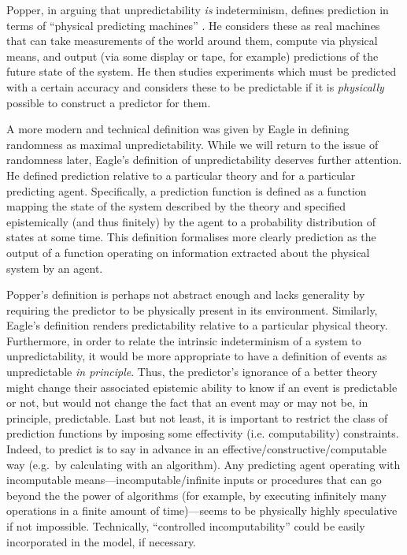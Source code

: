 \documentclass[%
 superscriptaddress,
 preprint,
 showpacs,
 showkeys,
 preprintnumbers,
  amsmath,amssymb,
  aps,
 pra,
  longbibliography,
  floatfix,
 ]{revtex4-1}
\theoremstyle{definition}
\begin{document}
Popper, in arguing that unpredictability \emph{is} indeterminism, defines prediction in terms of ``physical predicting machines'' \cite{popper-50i}.
He considers these as real machines that can take measurements of the world around them, compute via physical means, and output (via some display or tape, for example) predictions of the future state of the system.
He then studies experiments which must be predicted with a certain accuracy and considers these to be predictable if it is \emph{physically} possible to construct a predictor for them.

A more modern and technical definition was given by Eagle \cite{Eagle:2005ys} in defining randomness as maximal unpredictability.
While we will return to the issue of randomness later, Eagle's definition of unpredictability deserves further attention.
He defined prediction relative to a particular theory and for a particular predicting agent.
Specifically, a prediction function is defined as a function mapping the state of the system described by the theory and specified epistemically (and thus finitely) by the agent to a probability distribution of states at some time.
This definition formalises more clearly prediction as the output of a function operating on information extracted about the physical system by an agent.

Popper's definition is perhaps not abstract enough and lacks generality by requiring the predictor to be physically present in its environment.
Similarly, Eagle's definition renders predictability relative to a particular physical theory.
Furthermore, in order to relate the intrinsic indeterminism of a system to unpredictability, it would be more appropriate to have a definition of events as unpredictable \emph{in principle}.
Thus, the predictor's ignorance of a better theory might change their associated epistemic ability to know if an event is predictable or not, but would not change the fact that an event may or may not be, in principle, predictable.
Last but not least,  it is important to restrict the class of prediction functions by imposing some effectivity (i.e. computability) constraints.
Indeed, to predict is to say in advance in an effective/constructive/computable way (e.g.\ by calculating with an algorithm).
Any predicting agent operating with incomputable means---incomputable/infinite inputs or procedures that can go beyond the
the power of algorithms (for example, by executing infinitely many operations in a finite amount of time)---seems to be physically highly speculative if not impossible.
Technically, ``controlled incomputability'' could be easily incorporated in the model, if necessary.
\end{document}
